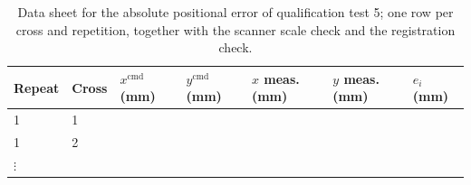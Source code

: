 \begin{table}[h]
\centering
\fontsize{10}{12}\selectfont
\begin{tabularx}{\linewidth}{|l|l|l|l|l|l|X|}
\hline
\textbf{Repeat} & \textbf{Cross} & \textbf{$x^{\mathrm{cmd}}$ (mm)} & \textbf{$y^{\mathrm{cmd}}$ (mm)} & \textbf{$x$ meas. (mm)} & \textbf{$y$ meas. (mm)} & \textbf{$e_i$ (mm)} \\
\hline
1 & 1 & & & & & \\
\hline
1 & 2 & & & & & \\
\hline
$\vdots$ & & & & & & \\
\hline
\end{tabularx}
\caption{Data sheet for the absolute positional error of qualification test 5; one row per cross and repetition, together with the scanner scale check and the registration check.}
\label{tab:res-sheet}
\end{table}
